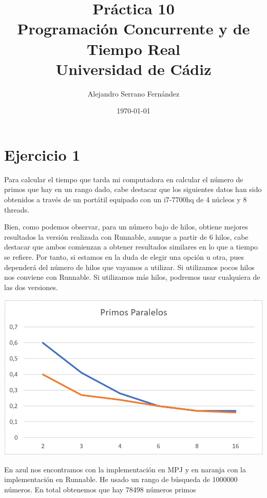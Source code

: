 \documentclass{article}
\title{Práctica 10 \\ Programación Concurrente y de Tiempo Real \\Universidad de Cádiz} %
\author{Alejandro Serrano Fernández} %
\date{\today} %
\begin{document}
\maketitle %


\section{Ejercicio 1}
Para calcular el tiempo que tarda mi computadora en calcular el número de primos que hay en un rango dado, cabe destacar que los siguientes datos han sido obtenidos a través de un portátil equipado con un i7-7700hq de 4 núcleos y 8 threads. 

Bien, como podemos observar, para un número bajo de hilos, obtiene mejores resultados la versión realizada con Runnable, aunque a partir de 6 hilos, cabe destacar que ambos comienzan a obtener resultados similares en lo que a tiempo se refiere. Por tanto, si estamos en la duda de elegir una opción u otra, pues dependerá del número de hilos que vayamos a utilizar. Si utilizamos pocos hilos nos conviene con Runnable. Si utilizamos más hilos, podremos usar cualquiera de las dos versiones. 


\begin{center}
\includegraphics[scale=0.5]{grafica.png}
\end{center}
En azul nos encontramos con la implementación en MPJ y en naranja con la implementación en Runnable. He usado un rango de búsqueda de 1000000 números. En total obtenemos que hay 78498 números primos
\end{document}
